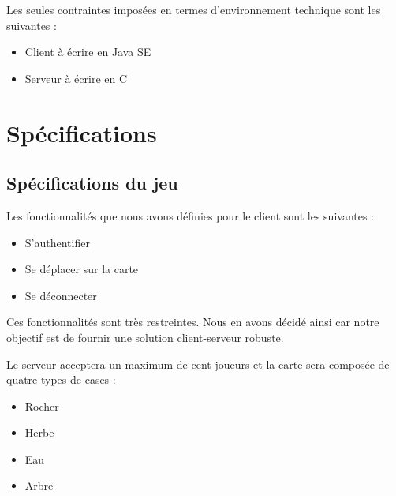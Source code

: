 \documentclass[11pt, a4paper]{report}
\begin{document}
    Les seules contraintes imposées en termes d’environnement technique sont les suivantes :
    \newline
    
    \begin{itemize}
    
     \item Client à écrire en Java SE
     \item Serveur à écrire en C
     
    \end{itemize}
    
\chapter{Spécifications}

  \section{Spécifications du jeu}
    
    Les fonctionnalités que nous avons définies pour le client sont les suivantes :
    
    \begin{itemize}
    
      \item S'authentifier
      \item Se déplacer sur la carte
      \item Se déconnecter\newline
	
    \end{itemize}
    
    Ces fonctionnalités sont très restreintes. Nous en avons décidé ainsi car notre objectif est de fournir une solution client-serveur robuste.\newline
    
    Le serveur acceptera un maximum de cent joueurs et la carte sera composée de quatre types de cases :
    \newline
    
    \begin{itemize}
    
      \item Rocher
      \item Herbe
      \item Eau
      \item Arbre\newline
	
    \end{itemize}
    
\end{document}
